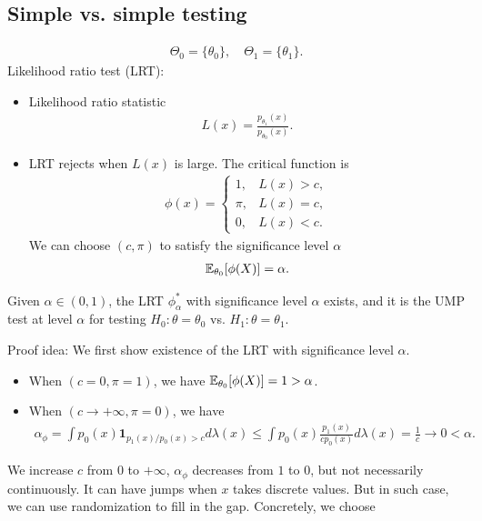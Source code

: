 \documentclass[11pt,letterpaper]{article}
\numberwithin{theorem}{lecture}
\numberwithin{proposition}{lecture}
\numberwithin{lemma}{lecture}
\numberwithin{claim}{lecture}
\numberwithin{corollary}{lecture}
\numberwithin{definition}{lecture}
\numberwithin{conjecture}{lecture}
\numberwithin{remark}{lecture}
\numberwithin{example}{lecture}
\numberwithin{equation}{lecture}
\begin{document}
\subsection{Simple vs. simple testing}
\begin{align*}
  \Theta_0 = \{\theta_0\}, \quad \Theta_1 = \{\theta_1\}.
\end{align*}
Likelihood ratio test (LRT):
\begin{itemize}
\item Likelihood ratio statistic
\begin{align*}
  L (x) = \frac{p_{\theta_1} (x)}{p_{\theta_0} (x)}.
\end{align*}
\item LRT rejects when $L (x)$ is large. The critical function is
\begin{align*}
  \phi (x) = \begin{cases}
    1, & L (x) > c,\\
    \pi, & L (x) = c,\\
    0, & L (x) < c.
  \end{cases}
\end{align*}
We can choose $(c, \pi)$ to satisfy the significance level $\alpha$
\begin{align*}
  {\mathbb{E}}_{\theta_0} [\phi (X)] = \alpha.
\end{align*}
\end{itemize}
\begin{lemma}
  Given $\alpha \in (0, 1)$, the LRT $\phi^*_\alpha$ with significance level $\alpha$ exists, and it is the UMP test at level $\alpha$ for testing $H_0: \theta = \theta_0$ vs. $H_1: \theta = \theta_1$.
\end{lemma}
Proof idea:
We first show existence of the LRT with significance level $\alpha$.
\begin{itemize}
  \item When $(c =0, \pi = 1)$, we have ${\mathbb{E}}_{\theta_0} [\phi (X)] = 1 > \alpha$.
  \item When $(c \rightarrow + \infty, \pi = 0)$, we have
  \begin{align*}
    \alpha_\phi = \int p_0 (x) \bm{1}_{p_1 (x) / p_0 (x) > c} d\lambda(x) \leq \int p_0 (x) \frac{p_1 (x)}{c p_0 (x)} d\lambda(x) = \frac{1}{c} \rightarrow 0 < \alpha.
  \end{align*}
\end{itemize}
We increase $c$ from $0$ to $+\infty$, $\alpha_\phi$ decreases from $1$ to $0$, but not necessarily continuously. It can have jumps when $x$ takes discrete values. But in such case, we can use randomization to fill in the gap. Concretely, we choose
\end{document}
